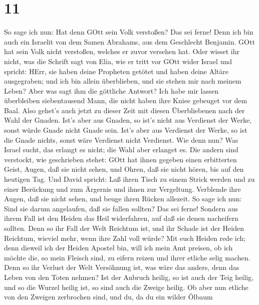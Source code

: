 \hypertarget{section-10}{%
\section{11}\label{section-10}}

 So sage ich nun: Hat denn GOtt sein Volk verstoßen? Das sei
ferne! Denn ich bin auch ein Israelit von dem Samen Abrahams, aus dem
Geschlecht Benjamin.  GOtt hat sein Volk nicht verstoßen,
welches er zuvor versehen hat. Oder wisset ihr nicht, was die Schrift
sagt von Elia, wie er tritt vor GOtt wider Israel und spricht:
 HErr, sie haben deine Propheten getötet und haben deine
Altäre ausgegraben; und ich bin allein überblieben, und sie stehen mir
nach meinem Leben?  Aber was sagt ihm die göttliche Antwort?
Ich habe mir lassen überbleiben siebentausend Mann, die nicht haben ihre
Kniee gebeuget vor dem Baal.  Also gehet's auch jetzt zu
dieser Zeit mit diesen Überbliebenen nach der Wahl der Gnaden.
 Ist's aber aus Gnaden, so ist's nicht aus Verdienst der
Werke, sonst würde Gnade nicht Gnade sein. Ist's aber aus Verdienst der
Werke, so ist die Gnade nichts, sonst wäre Verdienst nicht Verdienst.
 Wie denn nun? Was Israel sucht, das erlangt es nicht; die
Wahl aber erlanget es. Die andern sind verstockt,  wie
geschrieben stehet: GOtt hat ihnen gegeben einen erbitterten Geist,
Augen, daß sie nicht sehen, und Ohren, daß sie nicht hören, bis auf den
heutigen Tag.  Und David spricht: Laß ihren Tisch zu einem
Strick werden und zu einer Berückung und zum Ärgernis und ihnen zur
Vergeltung.  Verblende ihre Augen, daß sie nicht sehen, und
beuge ihren Rücken allezeit.  So sage ich nun: Sind sie
darum angelaufen, daß sie fallen sollten? Das sei ferne! Sondern aus
ihrem Fall ist den Heiden das Heil widerfahren, auf daß sie denen
nacheifern sollten.  Denn so ihr Fall der Welt Reichtum
ist, und ihr Schade ist der Heiden Reichtum, wieviel mehr, wenn ihre
Zahl voll würde?  Mit euch Heiden rede ich; denn dieweil
ich der Heiden Apostel bin, will ich mein Amt preisen,  ob
ich möchte die, so mein Fleisch sind, zu eifern reizen und ihrer etliche
selig machen.  Denn so ihr Verlust der Welt Versöhnung ist,
was wäre das anders, denn das Leben von den Toten nehmen? 
Ist der Anbruch heilig, so ist auch der Teig heilig, und so die Wurzel
heilig ist, so sind auch die Zweige heilig.  Ob aber nun
etliche von den Zweigen zerbrochen sind, und du, da du ein wilder Ölbaum
